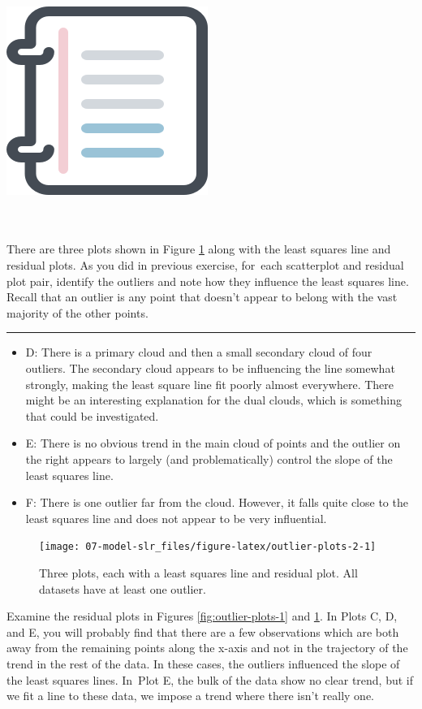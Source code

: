 \documentclass[
  10pt,
  openany]{book}
\newenvironment{mdframedwithfootGPWE}
{   
    \savenotes
    \begin{mdframed}[%
    topline=true, bottomline=true, linecolor=oiB, linewidth=0.5pt,
    rightline=false, leftline=false,
    backgroundcolor=oiLGray]
    \renewcommand{\thempfootnote}{\arabic{footnote}}
    }
{
    \end{mdframed}
    \spewnotes
}
\newenvironment{workedexample}{
    \let\oldrule\rule
    \renewcommand{\rule}[2]{\vspace{-2mm}\oldrule{##1}{##2}\vspace{-2mm}}
\vspace{4mm}
\begin{mdframedwithfootGPWE}
\begin{minipage}[t]{0.10\textwidth}
{$\:$ \\ \setkeys{Gin}{width=2.5em,keepaspectratio}\includegraphics{images/_icons/worked-example.png}}
\end{minipage}
\hfill
\begin{minipage}[t]{0.90\textwidth}
\vspace{-2mm}
\setlength{\parskip}{1em}
\noindent\textbf{\color{oiB}\small\fontfamily{phv}\selectfont{\MakeUppercase{Example}}} $\:$ \\ \\
}{\end{minipage}
\end{mdframedwithfootGPWE}
\vspace{4mm}
}
\begin{document}
\begin{workedexample}

There are three plots shown in Figure \ref{fig:outlier-plots-2} along with the least squares line and residual plots.
As you did in previous exercise, for~each scatterplot and residual plot pair, identify the outliers and note how they influence the least squares line.
Recall that an outlier is any point that doesn't appear to belong with the vast majority of the other points.

\begin{center}\rule{0.5\linewidth}{0.5pt}\end{center}

\begin{itemize}
\item
  D: There is a primary cloud and then a small secondary cloud of four outliers.
  The secondary cloud appears to be influencing the line somewhat strongly, making the least square line fit poorly almost everywhere.
  There might be an interesting explanation for the dual clouds, which is something that could be investigated.
\item
  E: There is no obvious trend in the main cloud of points and the outlier on the right appears to largely (and problematically) control the slope of the least squares line.
\item
  F: There is one outlier far from the cloud.
  However, it falls quite close to the least squares line and does not appear to be very influential.
\end{itemize}

\end{workedexample}

\begin{figure}[h]

{\centering \texttt{[image: 07-model-slr\_files/figure-latex/outlier-plots-2-1]} 

}

\caption{Three plots, each with a least squares line and residual plot. All datasets have at least one outlier.}\label{fig:outlier-plots-2}
\end{figure}

Examine the residual plots in Figures \ref{fig:outlier-plots-1} and \ref{fig:outlier-plots-2}.
In Plots C, D, and E, you will probably find that there are a few observations which are both away from the remaining points along the x-axis and not in the trajectory of the trend in the rest of the data.
In these cases, the outliers influenced the slope of the least squares lines.
In~Plot E, the bulk of the data show no clear trend, but if we fit a line to these data, we impose a trend where there isn't really one.
\end{document}
